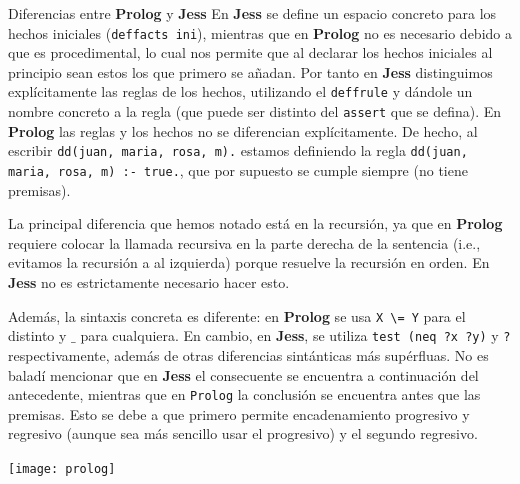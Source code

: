 \documentclass[11pt, a4paper, spanish, openright, twoside]{book}
\begin{document}
\begin{section}{Diferencias entre \textbf{Prolog} y \textbf{Jess}}
		En \textbf{Jess} se define un espacio concreto para los hechos iniciales (\texttt{deffacts ini}), mientras que en \textbf{Prolog} no es necesario debido a que es procedimental, lo cual nos permite que 
		al declarar los hechos iniciales al principio sean estos los que primero se añadan.
		Por tanto en \textbf{Jess} distinguimos explícitamente las reglas de los hechos, utilizando el \texttt{deffrule} y dándole un nombre concreto a la regla (que puede ser distinto del \texttt{assert} que se defina). En \textbf{Prolog} las reglas 
		y los hechos no se diferencian explícitamente. De hecho, al escribir  \texttt{dd(juan, maria, rosa, m).} estamos definiendo la regla \texttt{dd(juan, maria, rosa, m) :- true.}, que por supuesto se cumple siempre (no tiene premisas).
		
		La principal diferencia que hemos notado está en la recursión, ya  que en \textbf{Prolog} requiere colocar la llamada recursiva en la parte derecha de la sentencia (i.e., evitamos la recursión a al izquierda) porque resuelve la recursión en orden. En \textbf{Jess} no es estrictamente necesario hacer esto.
      
      Además, la sintaxis concreta es diferente: en \textbf{Prolog} se usa \texttt{X \textbackslash = Y} para el distinto y $\_$ para cualquiera. En cambio, en \textbf{Jess}, se utiliza \texttt{test (neq ?x ?y)} y \texttt{?} respectivamente, además de otras diferencias sintánticas más supérfluas. No es baladí mencionar que en \textbf{Jess} el consecuente se encuentra a continuación del antecedente, mientras que en \texttt{Prolog} la conclusión se encuentra antes que las premisas. Esto se debe a que primero permite encadenamiento progresivo y regresivo (aunque sea más sencillo usar el progresivo) y el segundo regresivo.

\begin{center}
	\texttt{[image: prolog]}
\end{center}
	
\end{section}
	\newpage
\end{document}
